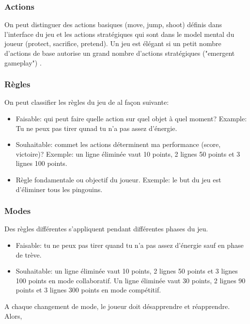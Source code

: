\subsubsection{Actions}

On peut distinguer des actions basiques (move, jump, shoot) d\'efinis dans l'interface du jeu et les actions strat\'egiques qui sont dans le model mental du joueur (protect, sacrifice, pretend). Un jeu est \'el\'egant si un petit nombre d'actions de base autorise un grand nombre d'actions strat\'egiques ("emergent gameplay") .

\subsubsection{R\`egles}

On peut classifier les r\`egles du jeu de al fa\c{c}on suivante:

\begin{itemize}
\item Faisable: qui peut faire quelle action sur quel objet \`a quel moment? Example: Tu ne peux pas tirer qunad tu n'a pas assez d'\'energie.
\item Souhaitable: commet les actions d\'eterminent ma performance (score, victoire)? Exemple: un ligne \'elimin\'ee vaut 10 points, 2 lignes 50 points et 3 lignes 100 points.
\item R\`egle fondamentale ou objectif du joueur. Exemple: le but du jeu est d'\'eliminer tous les pingouins.
\end{itemize}

\subsubsection{Modes}

Des r\`egles diff\'erentes s'appliquent pendant diff\'erentes phases du jeu.

\begin{itemize}
\item Faisable: tu ne peux pas tirer quand tu n'a pas assez d'\'energie sauf en phase de tr\`eve.
\item Souhaitable: un ligne \'elimin\'ee vaut 10 points, 2 lignes 50 points et 3 lignes 100 points en mode collaboratif. Un ligne \'elimin\'ee vaut 30 points, 2 lignes 90 points et 3 lignes 300 points en mode comp\'etitif.
\end{itemize}

A chaque changement de mode, le joueur doit d\'esapprendre et r\'eapprendre. Alors,

